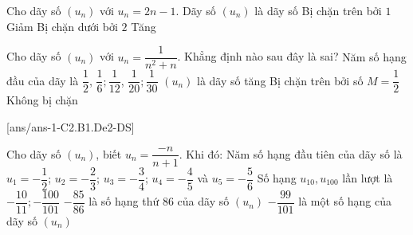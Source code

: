 \begin{ex}%
	Cho dãy số $\left(u_{n} \right)$ với $u_{n} =2n-1$. Dãy số $\left(u_{n} \right)$ là dãy số
	\choice
	{Bị chặn trên bởi $1$}
	{Giảm}
	{Bị chặn dưới bởi $2$}
	{\True Tăng}
\end{ex}

\begin{ex}%
	Cho dãy số $\left(u_{n} \right)$ với $u_{n} =\dfrac{1}{n^{2} +n} $. Khẳng định nào sau đây là sai?
	\choice
	{Năm số hạng đầu của dãy là $\dfrac{1}{2}$, $\dfrac{1}{6} ;\dfrac{1}{12}$, $\dfrac{1}{20} ;\dfrac{1}{30}$}
	{\True $\left(u_{n} \right)$ là dãy số tăng}
	{Bị chặn trên bởi số $M=\dfrac{1}{2}$}
	{Không bị chặn}
\end{ex}


\cauds
{}[ans/ans-1-C2.B1.De2-DS]
\begin{ex}%
	Cho dãy số $\left(u_{n} \right)$, biết $u_{n} =\dfrac{-n}{n+1}$. Khi đó:
	\choiceTF
	{\True Năm số hạng đầu tiên của dãy số là $u_{1} =-\dfrac{1}{2}$; $u_{2} =-\dfrac{2}{3}$; $u_{3} =-\dfrac{3}{4}$; $u_{4} =-\dfrac{4}{5}$ và $u_{5} =-\dfrac{5}{6}$}
	{\True Số hạng $u_{10} ,u_{100} $ lần lượt là $-\dfrac{10}{11} ;-\dfrac{100}{101} $}
	{$-\dfrac{85}{86} $ là số hạng thứ $86$ của dãy số $\left(u_{n} \right)$ }
	{$-\dfrac{99}{101} $ là một số hạng của dãy số $\left(u_{n} \right)$ }
\end{ex}

